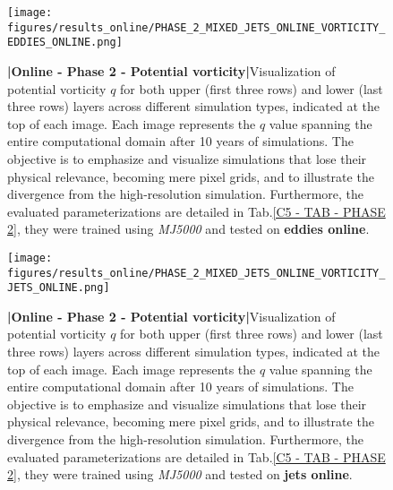%
%
\newpage

\begin{figure}[H]
    \centering
    \texttt{[image: figures/results\_online/PHASE\_2\_MIXED\_JETS\_ONLINE\_VORTICITY\_EDDIES\_ONLINE.png]}
    \caption{\textbf{|}\textcolor{section_color}{\textbf{Online - Phase 2 - Potential vorticity}}\textbf{|}Visualization of potential vorticity $q$ for both upper (first three rows) and lower (last three rows) layers across different simulation types, indicated at the top of each image. Each image represents the $q$ value spanning the entire computational domain after 10 years of simulations. The objective is to emphasize and visualize simulations that lose their physical relevance, becoming mere pixel grids, and to illustrate the divergence from the high-resolution simulation. Furthermore, the evaluated parameterizations are detailed in Tab.\ref{C5 - TAB - PHASE 2}, they were trained using \textit{MJ5000} and tested on \textbf{eddies online}.}
    \label{APP - ONLINE - PHASE 2 - VORTICITY -  JETS MIXED 5000 and EDDIES ONLINE}
\end{figure}

\newpage

\begin{figure}[H]
    \centering
    \texttt{[image: figures/results\_online/PHASE\_2\_MIXED\_JETS\_ONLINE\_VORTICITY\_JETS\_ONLINE.png]}
    \caption{\textbf{|}\textcolor{section_color}{\textbf{Online - Phase 2 - Potential vorticity}}\textbf{|}Visualization of potential vorticity $q$ for both upper (first three rows) and lower (last three rows) layers across different simulation types, indicated at the top of each image. Each image represents the $q$ value spanning the entire computational domain after 10 years of simulations. The objective is to emphasize and visualize simulations that lose their physical relevance, becoming mere pixel grids, and to illustrate the divergence from the high-resolution simulation. Furthermore, the evaluated parameterizations are detailed in Tab.\ref{C5 - TAB - PHASE 2}, they were trained using \textit{MJ5000} and tested on \textbf{jets online}.}
    \label{APP - ONLINE - PHASE 2 - VORTICITY -  JETS MIXED 5000 and JETS ONLINE}
\end{figure}

